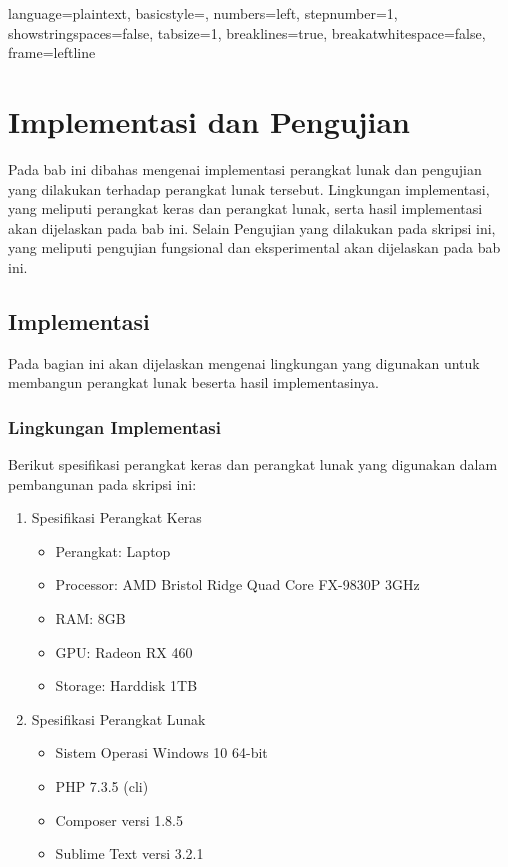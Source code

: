 
\lstset
{ 
    language=plaintext,
    basicstyle=\footnotesize,
    numbers=left,
    stepnumber=1,
    showstringspaces=false,
    tabsize=1,
    breaklines=true,
    breakatwhitespace=false,
    frame=leftline
}

\chapter{Implementasi dan Pengujian}
\label{chap:implementasiDanPengujian}

Pada bab ini dibahas mengenai implementasi perangkat lunak dan pengujian yang dilakukan terhadap perangkat lunak tersebut. Lingkungan implementasi, yang meliputi perangkat keras dan perangkat lunak, serta hasil implementasi akan dijelaskan pada bab ini. Selain Pengujian yang dilakukan pada skripsi ini, yang meliputi pengujian fungsional dan eksperimental akan dijelaskan pada bab ini.

\section{Implementasi}
Pada bagian ini akan dijelaskan mengenai lingkungan yang digunakan untuk membangun perangkat lunak beserta hasil implementasinya.

\subsection{Lingkungan Implementasi}
Berikut spesifikasi perangkat keras dan perangkat lunak yang digunakan dalam pembangunan pada skripsi ini:

\begin{enumerate}
	\item Spesifikasi Perangkat Keras
	
		\begin{itemize}
			\item Perangkat: Laptop
			\item Processor: AMD Bristol Ridge Quad Core FX-9830P 3GHz
			\item RAM: 8GB
			\item GPU: Radeon RX 460
			\item Storage: Harddisk 1TB
		\end{itemize}		

	\item Spesifikasi Perangkat Lunak

		\begin{itemize}
			\item Sistem Operasi Windows 10 64-bit
			\item PHP 7.3.5 (cli)
			\item Composer versi 1.8.5
			\item Sublime Text versi 3.2.1
		\end{itemize}	
	
\end{enumerate}

